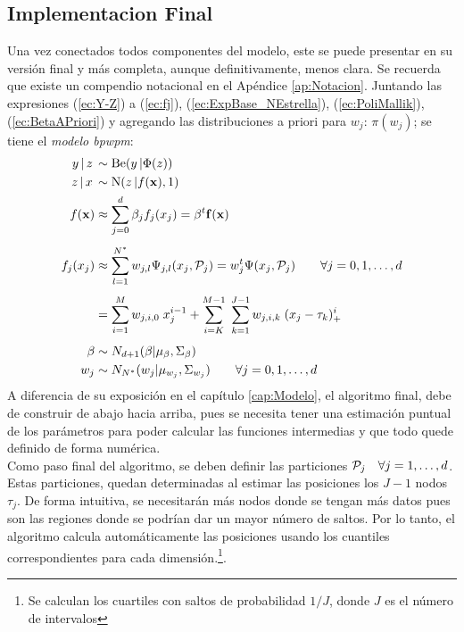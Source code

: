 \documentclass[../Main/Main.tex]{subfiles}
\begin{document}
\subsection{Implementacion Final}
Una vez conectados todos componentes del modelo, este se puede presentar en su versión final y más completa, aunque definitivamente, menos clara. Se recuerda que existe un compendio notacional en el Apéndice \ref{ap:Notacion}. Juntando las expresiones (\ref{ec:Y-Z}) a (\ref{ec:fj}), (\ref{ec:ExpBase_NEstrella}), (\ref{ec:PoliMallik}), (\ref{ec:BetaAPriori}) y agregando las distribuciones a priori para $w_j$: $\pi(w_j)$; se tiene el \textit{modelo bpwpm}:
\begin{align}
	y\,|\,z\, &\sim \text{Be}(y\,|\Phi(z)) \nonumber\\ 
	z\,|\,x\, &\sim \text{N}(z\,|f(\xsn),1)\nonumber \\
	f(\xsn) &\approx \sum_{j=0}^d \beta_j f_j(x_j) 
			= \beta^t\fsn(\xsn)  \nonumber\\[4pt]
	f_j(x_j)&\approx \sum_{l = 1}^{\N} w_{j,l} \Psi_{j,l}(x_j, \mathcal{P}_j) 				=  w_j^t\Psi(x_j,\P_j) \quad\quad \forall j= 0,1,\ldots,d
			\nonumber\\[4pt]
 		 	&=	\sum_{i = 1}^M w_{j,i,0} \; x_j^{i-1} + 
			\sum_{i = K}^{M-1} \;
	 		\sum_{k = 1}^{J-1}w_{j,i,k}\;(x_j - \t_k)_+^{i} 
			\nonumber \\[4pt]	 					
	 		\beta &\sim N_{d+1}(\beta|\mu_{\beta}, \Sigma_{\beta})	\nonumber \\
	w_j  &\sim N_{\N}(w_j|\mu_{w_j},\Sigma_{w_j}) \quad\quad \forall j= 0,1,\ldots,d \label{ec:ModBPWPM}
\end{align}
A diferencia de su exposición en el capítulo \ref{cap:Modelo}, el algoritmo final, debe de construir de abajo hacia arriba, pues se necesita tener una estimación puntual de los parámetros para poder calcular las funciones intermedias y que todo quede definido de forma numérica.\\

Como paso final del algoritmo, se deben definir las particiones $\P_j \quad \forall j= 1,\ldots,d$. Estas particiones, quedan determinadas al estimar las posiciones los $J-1$ nodos $\tau_j$. De forma intuitiva, se necesitarán más nodos donde se tengan más datos pues son las regiones donde se podrían dar un mayor número de saltos. Por lo tanto, el algoritmo calcula automáticamente las posiciones usando los cuantiles correspondientes para cada dimensión.\footnote{Se calculan los cuartiles con saltos de probabilidad $1/J$, donde $J$ es el número de intervalos}.\\ 
\end{document}
